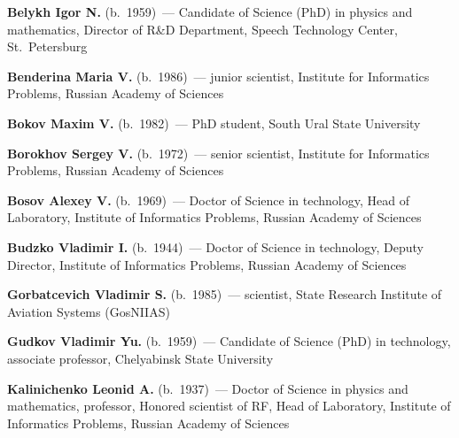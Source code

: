 \begin{multicols}{2}

\noindent
\textbf{Belykh Igor N.} (b.\ 1959)~--- Candidate of Science (PhD) in 
physics and mathematics, Director of R\&D Department, Speech Technology Center, 
St.~Petersburg

\vspace*{6pt}

\noindent
\textbf{Benderina Maria V.} (b.\ 1986)~--- junior scientist, 
Institute for Informatics Problems, Russian Academy of Sciences 

\vspace*{6pt}

\noindent
\textbf{Bokov Maxim V.} (b.\ 1982)~--- PhD student, South Ural State University


\vspace*{6pt}

\noindent
\textbf{Borokhov Sergey V.} (b.\ 1972)~--- senior scientist, 
Institute for Informatics Problems, Russian Academy of Sciences 

\vspace*{6pt}

  \noindent
\textbf{Bosov Alexey V.} (b.\ 1969)~--- Doctor of Science in technology, Head of
Laboratory, Institute of Informatics Problems, Russian Academy of Sciences

\vspace*{6pt}

\noindent
\textbf{Budzko Vladimir I.} (b.\ 1944)~--- Doctor of Science in technology, 
Deputy Director, Institute of Informatics Problems, Russian Academy of Sciences

\vspace*{6pt}

\noindent
\textbf{Gorbatcevich Vladimir S.} (b.\ 1985)~--- scientist, 
State Research Institute of Aviation Systems (GosNIIAS)

\vspace*{6pt}

\noindent
\textbf{Gudkov Vladimir Yu.} (b.\ 1959)~--- 
Candidate of Science (PhD) in technology, associate professor,  Chelyabinsk State University

\vspace*{6pt}

\noindent
\textbf{Kalinichenko Leonid A.} (b.\ 1937)~--- Doctor of Science in physics and mathematics, 
professor, Honored scientist of RF, 
Head of Laboratory, Institute of Informatics Problems, Russian Academy of Sciences 


\end{multicols}
